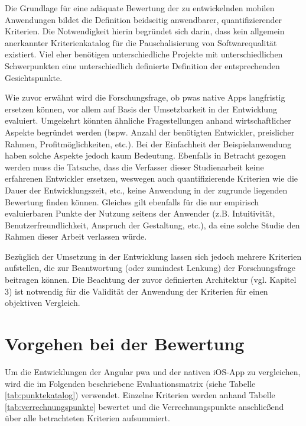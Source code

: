 Die Grundlage für eine adäquate Bewertung der zu entwickelnden mobilen Anwendungen bildet die Definition beidseitig anwendbarer, quantifizierender Kriterien. Die Notwendigkeit hierin begründet sich darin, dass kein allgemein anerkannter Kriterienkatalog für die Pauschalisierung von Softwarequalität existiert. Viel eher benötigen unterschiedliche Projekte mit unterschiedlichen Schwerpunkten eine unterschiedlich definierte Definition der entsprechenden Gesichtspunkte.

Wie zuvor erwähnt wird die Forschungsfrage, ob \acp{pwa} native Apps langfristig ersetzen können, vor allem auf Basis der Umsetzbarkeit in der Entwicklung evaluiert. Umgekehrt könnten ähnliche Fragestellungen anhand wirtschaftlicher Aspekte begründet werden (bspw. Anzahl der benötigten Entwickler, preislicher Rahmen, Profitmöglichkeiten, etc.). Bei der Einfachheit der Beispielanwendung haben solche Aspekte jedoch kaum Bedeutung. Ebenfalls in Betracht gezogen werden muss die Tatsache, dass die Verfasser dieser Studienarbeit keine erfahrenen Entwickler ersetzen, weswegen auch quantifizierende Kriterien wie die Dauer der Entwicklungszeit, etc., keine Anwendung in der zugrunde liegenden Bewertung finden können. Gleiches gilt ebenfalls für die nur empirisch evaluierbaren Punkte der Nutzung seitens der Anwender (z.B. Intuitivität, Benutzerfreundlichkeit, Anspruch der Gestaltung, etc.), da eine solche Studie den Rahmen dieser Arbeit verlassen würde.

Bezüglich der Umsetzung in der Entwicklung lassen sich jedoch mehrere Kriterien aufstellen, die zur Beantwortung (oder zumindest Lenkung) der Forschungsfrage beitragen können. Die Beachtung der zuvor definierten Architektur (vgl. Kapitel 3) ist notwendig für die Validität der Anwendung der Kriterien für einen objektiven Vergleich.

\section{Vorgehen bei der Bewertung}
Um die Entwicklungen der Angular \ac{pwa} und der nativen iOS-App zu vergleichen, wird die im Folgenden beschriebene Evaluationsmatrix (siehe Tabelle \ref{tab:punktekatalog}) verwendet. Einzelne Kriterien werden anhand Tabelle \ref{tab:verrechnungspunkte} bewertet und die Verrechnungspunkte anschließend über alle betrachteten Kriterien aufsummiert.


